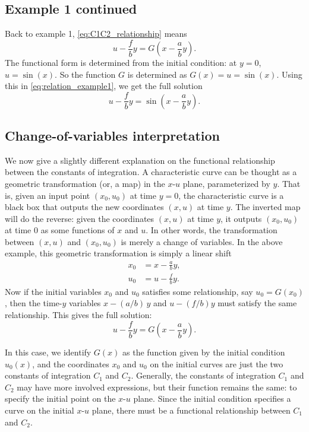 \documentclass{article}
\begin{document}
\subsection{Example 1 continued}

Back to example 1, \eqref{eq:C1C2_relationship} means
\begin{equation}
u - \frac f b y = G\left(x - \frac a b y\right).
\label{eq:relation_example1}
\end{equation}
The functional form is determined from the initial condition:
at $y = 0$, $u = \sin(x)$.
So the function $G$ is determined as
$G(x) = u = \sin(x)$.
Using this in \eqref{eq:relation_example1}, we get
the full solution
$$
u - \frac f b y = \sin \left(x - \frac a b y\right).
$$


\subsection{Change-of-variables interpretation}


We now give a slightly different explanation
on the functional relationship between the constants
of integration.
%
A characteristic curve can be thought as
a geometric transformation (or, a map)
in the $x$-$u$ plane,
parameterized by $y$.
%
That is, given an input point $(x_0, u_0)$
at time $y = 0$,
the characteristic curve is a black box
that outputs the new coordinates $(x, u)$
at time $y$.
%
The inverted map will do the reverse:
given the coordinates $(x, u)$ at time $y$,
it outputs $(x_0, u_0)$ at time $0$
as some functions of $x$ and $u$.
%
In other words,
the transformation between $(x, u)$ and $(x_0, u_0)$
is merely a change of variables.
%
In the above example,
this geometric transformation is simply a linear shift
\begin{equation}
\begin{aligned}
x_0 &= x - \frac{a}{b} y, \\
u_0 &= u - \frac{f}{b} y.
\end{aligned}
\label{eq:geometric_transform}
\end{equation}
Now if the initial variables $x_0$ and $u_0$
satisfies some relationship, say $u_0 = G(x_0)$,
then the time-$y$ variables $x - (a/b) \, y$ and $u - (f/b) y$
must satisfy the same relationship.
%
This gives the full solution:
$$
u - \frac f b y = G\left( x - \frac a b y \right).
$$

In this case,
we identify $G(x)$
as the function given by the initial condition $u_0(x)$,
and the coordinates $x_0$ and $u_0$ on the initial curves
are just the two constants of integration $C_1$ and $C_2$.
%
Generally, the constants of integration $C_1$ and $C_2$
may have more involved expressions,
but their function remains the same:
to specify the initial point on the $x$-$u$ plane.
%
Since the initial condition specifies
a curve on the initial $x$-$u$ plane,
there must be a functional relationship
between $C_1$ and $C_2$.
\end{document}
